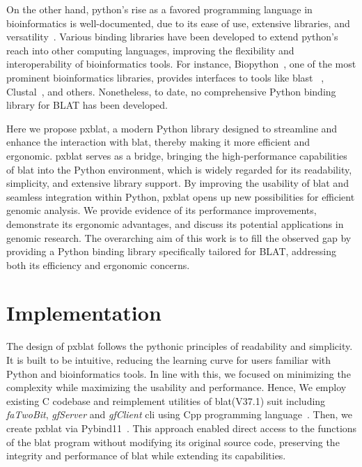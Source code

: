 On the other hand, python's rise as a favored programming language in bioinformatics is well-documented, due to its ease of use, extensive libraries, and versatility~\citep{perkel2015programming}.
Various binding libraries have been developed to extend python's reach into other computing languages, improving the flexibility and interoperability of bioinformatics tools.
For instance, Biopython~\citep{cock2009biopython}, one of the most prominent bioinformatics libraries, provides interfaces to tools like \acrshort{blast} ~\citep{altschul1990basic}, Clustal~\citep{higgins1988clustal}, and others.
Nonetheless, to date, no comprehensive Python binding library for BLAT has been developed.

Here we propose \acrshort{pxblat}, a modern Python library designed to streamline and enhance the interaction with \acrshort{blat}, thereby making it more efficient and ergonomic.
\acrshort{pxblat} serves as a bridge, bringing the high-performance capabilities of \acrshort{blat}  into the Python environment, which is widely regarded for its readability, simplicity, and extensive library support.
By improving the usability of \acrshort{blat}  and seamless integration within Python, \acrshort{pxblat} opens up new possibilities for efficient genomic analysis.
We provide evidence of its performance improvements, demonstrate its ergonomic advantages, and discuss its potential applications in genomic research.
The overarching aim of this work is to fill the observed gap by providing a Python binding library specifically tailored for BLAT, addressing both its efficiency and ergonomic concerns.

\section*{Implementation}\label{sec:implementation}


The design of \acrshort{pxblat} follows the pythonic principles of readability and simplicity.
It is built to be intuitive, reducing the learning curve for users familiar with Python and bioinformatics tools.
In line with this, we focused on minimizing the complexity while maximizing the usability and performance.
Hence, We employ existing C codebase and reimplement utilities of \acrshort{blat}(V37.1) suit  including \emph{faTwoBit}, \emph{gfServer} and \emph{gfClient} \acrshort{cli}  using Cpp programming language~\citep{kent2002blat}.
Then, we create \acrshort{pxblat} via Pybind11~\citep{pybind11}.
This approach enabled direct access to the functions of the \acrshort{blat} program without modifying its original source code, preserving the integrity and performance of \acrshort{blat} while extending its capabilities.

